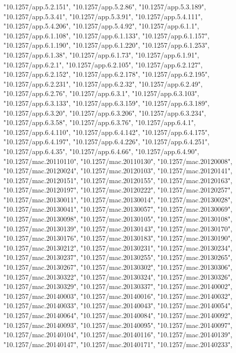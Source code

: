 \documentclass[]{article}
\begin{document}
\begin{itemize}
  "10.1257/app.5.2.151", "10.1257/app.5.2.86", "10.1257/app.5.3.189",
  "10.1257/app.5.3.41", "10.1257/app.5.3.91", "10.1257/app.5.4.111",
  "10.1257/app.5.4.206", "10.1257/app.5.4.92", "10.1257/app.6.1.1",
  "10.1257/app.6.1.108", "10.1257/app.6.1.133", "10.1257/app.6.1.157",
  "10.1257/app.6.1.190", "10.1257/app.6.1.220", "10.1257/app.6.1.253",
  "10.1257/app.6.1.38", "10.1257/app.6.1.73", "10.1257/app.6.1.91",
  "10.1257/app.6.2.1", "10.1257/app.6.2.105", "10.1257/app.6.2.127",
  "10.1257/app.6.2.152", "10.1257/app.6.2.178", "10.1257/app.6.2.195",
  "10.1257/app.6.2.231", "10.1257/app.6.2.32", "10.1257/app.6.2.49",
  "10.1257/app.6.2.76", "10.1257/app.6.3.1", "10.1257/app.6.3.103",
  "10.1257/app.6.3.133", "10.1257/app.6.3.159", "10.1257/app.6.3.189",
  "10.1257/app.6.3.20", "10.1257/app.6.3.206", "10.1257/app.6.3.234",
  "10.1257/app.6.3.58", "10.1257/app.6.3.76", "10.1257/app.6.4.1",
  "10.1257/app.6.4.110", "10.1257/app.6.4.142", "10.1257/app.6.4.175",
  "10.1257/app.6.4.197", "10.1257/app.6.4.226", "10.1257/app.6.4.251",
  "10.1257/app.6.4.35", "10.1257/app.6.4.66", "10.1257/app.6.4.90",
  "10.1257/mac.20110110", "10.1257/mac.20110130",
  "10.1257/mac.20120008", "10.1257/mac.20120024",
  "10.1257/mac.20120103", "10.1257/mac.20120141",
  "10.1257/mac.20120151", "10.1257/mac.20120155",
  "10.1257/mac.20120163", "10.1257/mac.20120197",
  "10.1257/mac.20120222", "10.1257/mac.20120257",
  "10.1257/mac.20130011", "10.1257/mac.20130014",
  "10.1257/mac.20130028", "10.1257/mac.20130041",
  "10.1257/mac.20130057", "10.1257/mac.20130069",
  "10.1257/mac.20130098", "10.1257/mac.20130105",
  "10.1257/mac.20130108", "10.1257/mac.20130139",
  "10.1257/mac.20130143", "10.1257/mac.20130170",
  "10.1257/mac.20130176", "10.1257/mac.20130183",
  "10.1257/mac.20130190", "10.1257/mac.20130212",
  "10.1257/mac.20130231", "10.1257/mac.20130234",
  "10.1257/mac.20130237", "10.1257/mac.20130255",
  "10.1257/mac.20130265", "10.1257/mac.20130267",
  "10.1257/mac.20130302", "10.1257/mac.20130306",
  "10.1257/mac.20130322", "10.1257/mac.20130324",
  "10.1257/mac.20130326", "10.1257/mac.20130329",
  "10.1257/mac.20130337", "10.1257/mac.20140002",
  "10.1257/mac.20140003", "10.1257/mac.20140016",
  "10.1257/mac.20140032", "10.1257/mac.20140033",
  "10.1257/mac.20140043", "10.1257/mac.20140054",
  "10.1257/mac.20140064", "10.1257/mac.20140084",
  "10.1257/mac.20140092", "10.1257/mac.20140093",
  "10.1257/mac.20140095", "10.1257/mac.20140097",
  "10.1257/mac.20140104", "10.1257/mac.20140116",
  "10.1257/mac.20140139", "10.1257/mac.20140147",
  "10.1257/mac.20140171", "10.1257/mac.20140233",

\end{itemize}
\end{document}
